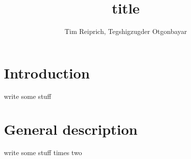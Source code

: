 \documentclass{article}
\title{title}
\author{Tim Reiprich, Tegshigzugder Otgonbayar}
\begin{document}
\pagestyle{plain}  %

\maketitle


\newpage

\tableofcontents %
\newpage


\section{Introduction}
write some stuff
\section{General description}
write some stuff times two
\end{document}
